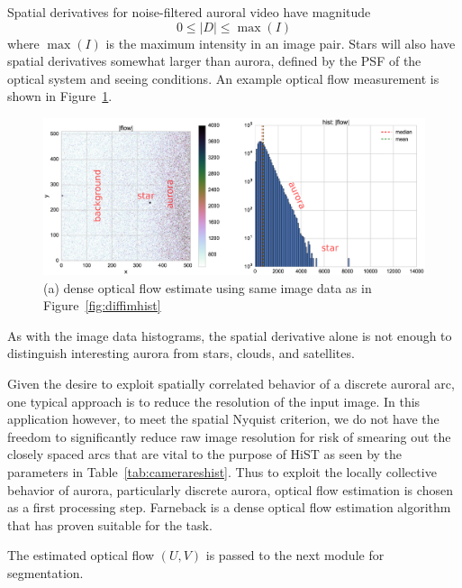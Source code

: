 Spatial derivatives for noise-filtered auroral video have magnitude
\begin{equation}
0 \leq |D| \leq \max(I)
\end{equation}
where $\max(I)$ is the maximum intensity in an image pair.
Stars will also have spatial derivatives somewhat larger than aurora, defined by the PSF of the optical system and seeing conditions.
An example optical flow measurement is shown in Figure~\ref{fig:optflowdiff}.
\begin{figure}\centering
    \includegraphics[width=\linewidth]{gfx/optflow-diffuse}
    \caption{(a) dense optical flow estimate using same image data as in Figure~\ref{fig:diffimhist}}\label{fig:optflowdiff}
\end{figure}
As with the image data histograms, the spatial derivative alone is not enough to distinguish interesting aurora from stars, clouds, and satellites.

Given the desire to exploit spatially correlated behavior of a discrete auroral arc, one typical approach is to reduce the resolution of the input image.
In this application however, to meet the spatial Nyquist criterion, we do not have the freedom to significantly reduce raw image resolution for risk of smearing out the closely spaced arcs that are vital to the purpose of HiST as seen by the parameters in Table~\ref{tab:camerareshist}.
Thus to exploit the locally collective behavior of aurora, particularly discrete aurora, optical flow estimation is chosen as a first processing step.
Farneback is a dense optical flow estimation algorithm that has proven suitable for the task.

The estimated optical flow $(U,V)$ is passed to the next module for segmentation.
